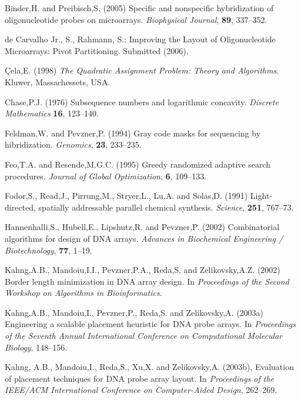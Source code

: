 \documentclass[english]{lni}
\begin{document}
\begin{thebibliography}{9}

 Binder,H. and Preibisch,S. (2005)
Specific and nonspecific hybridization of oligonucleotide probes on microarrays.
{\it Biophysical Journal}, {\bf 89}, 337--352.

de Carvalho Jr., S., Rahmann, S.:
Improving the Layout of Oligonucleotide Microarrays: Pivot Partitioning.
Submitted (2006).

 \c{C}ela,E. (1998) {\it The Quadratic
Assignment Problem: Theory and Algorithms}. Kluwer, Massachessets, USA.

 Chase,P.J. (1976) Subsequence numbers and
logarithmic concavity. {\it Discrete Mathematics} {\bf 16}, 123--140.

 Feldman,W. and Pevzner,P. (1994)
Gray code masks for sequencing by hibridization. {\it Genomics}, {\bf 23},
233--235.

 Feo,T.A. and Resende,M.G.C. (1995) Greedy
randomized adaptive search procedures. {\it Journal of Global Optimization},
{\bf 6}, 109--133.

 Fodor,S., Read,J., Pirrung,M.,
Stryer,L., Lu,A. and Solas,D. (1991) Light-directed, spatially addressable
parallel chemical synthesis. {\it Science}, {\bf 251}, 767--73.

 Hannenhalli,S.,
Hubell,E., Lipshutz,R. and Pevzner,P. (2002) Combinatorial algorithms for design
of DNA arrays. {\it Advances in Biochemical Engineering / Biotechnology},
{\bf 77}, 1--19.

 Kahng,A.B., Mandoiu,I.I.,
Pevzner,P.A., Reda,S. and Zelikovsky,A.Z. (2002) Border length minimization in
DNA array design. In {\it Proceedings of the Second Workshop on Algorithms in
Bioinformatics}.

 Kahng,A.B., Mandoiu,I.,
Pevzner,P., Reda,S. and Zelikovsky,A. (2003a) Engineering a scalable placement
heuristic for DNA probe arrays. In {\it Proceedings of the Seventh Annual
International Conference on Computational Molecular Biology}, 148--156.

 Kahng, A.B., Mandoiu,I., Reda,S.,
Xu,X. and Zelikovsky,A. (2003b), Evaluation of placement techniques for DNA
probe array layout. In {\it Proceedings of the IEEE/ACM International Conference
on Computer-Aided Design}, 262--269.


\end{thebibliography}
\end{document}
